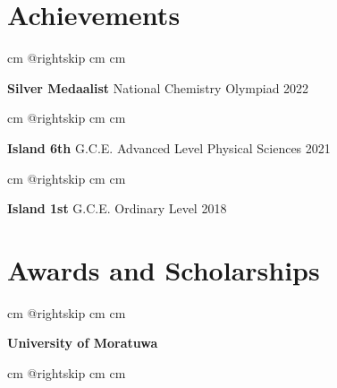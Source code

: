 \documentclass[10pt, a4paper]{article}
\begin{document}
    \section{Achievements}

        \begingroup{} cm
        \advance\csname @rightskip cm
        \advance{} cm

        \textbf{Silver Medaalist} National Chemistry Olympiad 2022 \par\endgroup

        \vspace{0.2 cm}
        \begingroup{} cm
        \advance\csname @rightskip cm
        \advance{} cm

        \textbf{Island 6th} G.C.E. Advanced Level Physical Sciences 2021 \par\endgroup
        
         \vspace{0.2 cm}
        \begingroup{} cm
        \advance\csname @rightskip cm
        \advance{} cm

        \textbf{Island 1st} G.C.E. Ordinary Level 2018 \par\endgroup

    \section{Awards and Scholarships}

        \begingroup{} cm
        \advance\csname @rightskip cm
        \advance{} cm

        \textbf{University of Moratuwa} 
        \par\endgroup

        \vspace{0.6 cm}
        \begingroup{} cm
        \advance\csname @rightskip cm
        \advance{} cm
\end{document}
